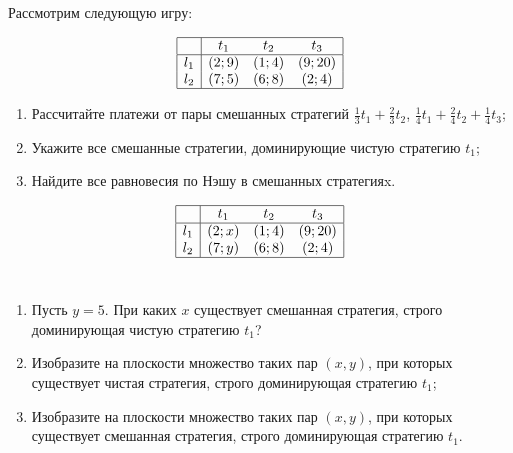 \begin{problem}[Доминирование]

Рассмотрим следующую игру:

\[\begin{array}{|c|ccc|}  \hline {} & {t_{1} } & {t_{2} } & {t_{3} } \\  \hline {l_{1} } & {\left(2;9\right)} & {\left(1;4\right)} & {\left(9;20\right)} \\ {l_{2} } & {\left(7;5\right)} & {\left(6;8\right)} & {\left(2;4\right)} \\  \hline  \end{array}\]
\begin{enumerate}
\item	Рассчитайте платежи от пары смешанных стратегий  $\frac{1}{3} t_{1} +\frac{2}{3} t_{2} $,  $\frac{1}{4} t_{1} +\frac{2}{4} t_{2} +\frac{1}{4} t_{3}$;

\item	Укажите все смешанные стратегии, доминирующие чистую стратегию  $t_{1} $;

\item	Найдите все равновесия по Нэшу в смешанных стратегияx.
\end{enumerate}


\begin{sol}

\end{sol}
\end{problem}



\begin{problem}[Доминирование-2]

\[\begin{array}{|c|ccc|}  \hline {} & {t_{1} } & {t_{2} } & {t_{3} } \\  \hline {l_{1} } & {\left(2;x\right)} & {\left(1;4\right)} & {\left(9;20\right)} \\ {l_{2} } & {\left(7;y\right)} & {\left(6;8\right)} & {\left(2;4\right)} \\  \hline  \end{array}\]\\
\begin{enumerate}
\item 	Пусть  $y=5$. При каких  $x$  существует смешанная стратегия, строго доминирующая чистую стратегию  $t_{1}$?\\
\item 	Изобразите на плоскости множество таких пар  $\left(x,y\right)$, при которых существует чистая стратегия, строго доминирующая стратегию  $t_{1}$;

\item 	Изобразите на плоскости множество таких пар  $\left(x,y\right)$, при которых существует смешанная стратегия, строго доминирующая стратегию  $t_{1}$.
\end{enumerate}


\begin{sol}

\end{sol}
\end{problem}



